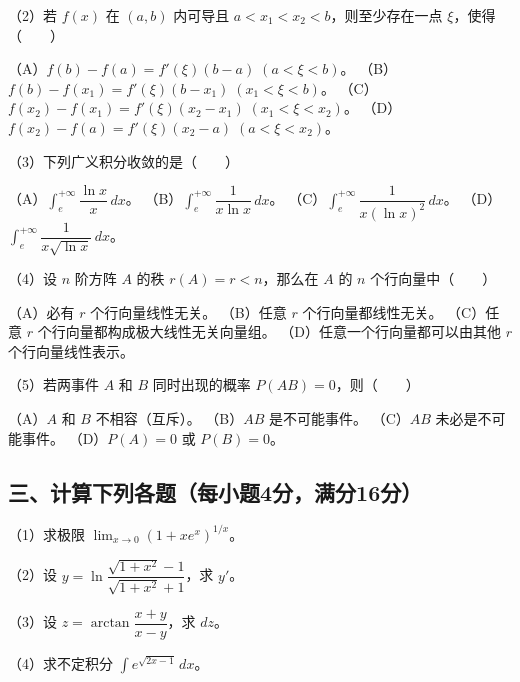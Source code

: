 \documentclass[UTF8,12pt]{ctexart}
\begin{document}
（2）若 \(\displaystyle f(x)\) 在 \(\displaystyle (a,\allowbreak b)\) 内可导且 \(\displaystyle a<x_1<x_2<b\)，则至少存在一点 \(\displaystyle \xi\)，使得（　　）


（A）\(\displaystyle f(b)-f(a)=f\prime(\xi)(b-a)\;(a<\xi<b)\)。 （B）\(\displaystyle f(b)-f(x_1)=f\prime(\xi)(b-x_1)\;(x_1<\xi<b)\)。 （C）\(\displaystyle f(x_2)-f(x_1)=f\prime(\xi)(x_2-x_1)\;(x_1<\xi<x_2)\)。 （D）\(\displaystyle f(x_2)-f(a)=f\prime(\xi)(x_2-a)\;(a<\xi<x_2)\)。


（3）下列广义积分收敛的是（　　）


（A）\(\displaystyle \int_e^{+\infty}\dfrac{\displaystyle \ln x}{\displaystyle x}\,dx\)。 （B）\(\displaystyle \int_e^{+\infty}\dfrac{\displaystyle 1}{\displaystyle x\ln x}\,dx\)。 （C）\(\displaystyle \int_e^{+\infty}\dfrac{\displaystyle 1}{\displaystyle x(\ln x)^2}\,dx\)。 （D）\(\displaystyle \int_e^{+\infty}\dfrac{\displaystyle 1}{\displaystyle x\sqrt{\ln x}}\,dx\)。


（4）设 \(\displaystyle n\) 阶方阵 \(\displaystyle A\) 的秩 \(\displaystyle r(A)=r<n\)，那么在 \(\displaystyle A\) 的 \(\displaystyle n\) 个行向量中（　　）


（A）必有 \(\displaystyle r\) 个行向量线性无关。 （B）任意 \(\displaystyle r\) 个行向量都线性无关。 （C）任意 \(\displaystyle r\) 个行向量都构成极大线性无关向量组。 （D）任意一个行向量都可以由其他 \(\displaystyle r\) 个行向量线性表示。


（5）若两事件 \(\displaystyle A\) 和 \(\displaystyle B\) 同时出现的概率 \(\displaystyle P(AB)=0\)，则（　　）


（A）\(\displaystyle A\) 和 \(\displaystyle B\) 不相容（互斥）。 （B）\(\displaystyle AB\) 是不可能事件。 （C）\(\displaystyle AB\) 未必是不可能事件。 （D）\(\displaystyle P(A)=0\) 或 \(\displaystyle P(B)=0\)。


\subsection*{三、计算下列各题（每小题4分，满分16分）}

（1）求极限 \(\displaystyle \lim_{x\to0}(1+xe^x)^{1/x}\)。


（2）设 \(\displaystyle y=\ln\dfrac{\displaystyle \sqrt{1+x^2}-1}{\displaystyle \sqrt{1+x^2}+1}\)，求 \(\displaystyle y\prime\)。


（3）设 \(\displaystyle z=\arctan\dfrac{\displaystyle x+y}{\displaystyle x-y}\)，求 \(\displaystyle dz\)。


（4）求不定积分 \(\displaystyle \int e^{\sqrt{2x-1}}\,dx\)。
\end{document}
